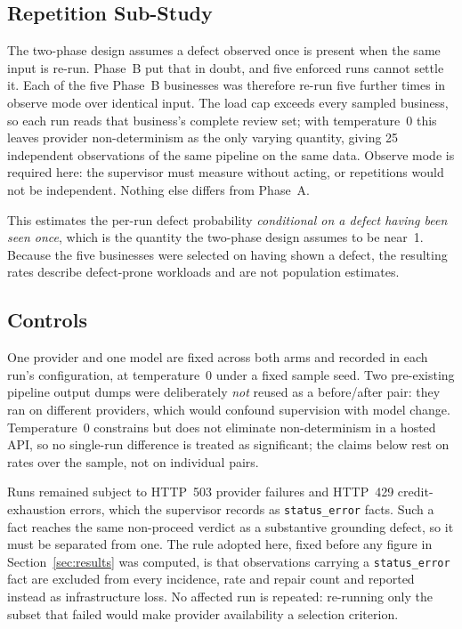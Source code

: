 \documentclass[runningheads]{llncs}
\begin{document}
\subsection{Repetition Sub-Study}
\label{sec:repetition}

The two-phase design assumes a defect observed once is present when the same
input is re-run. Phase~B put that in doubt, and five enforced runs cannot settle
it. Each of the five Phase~B businesses was therefore re-run five further times
in observe mode over identical input. The load cap exceeds every sampled
business, so each run reads that business's complete review set; with
temperature~0 this leaves provider non-determinism as the only varying quantity,
giving 25 independent observations of the same pipeline on the same data. Observe
mode is required here: the supervisor must measure without acting, or repetitions
would not be independent. Nothing else differs from Phase~A.

This estimates the per-run defect probability \emph{conditional on a defect
having been seen once}, which is the quantity the two-phase design assumes to be
near~1. Because the five businesses were selected on having shown a defect, the
resulting rates describe defect-prone workloads and are not population
estimates.

\subsection{Controls}

One provider and one model are fixed across both arms and recorded in each run's
configuration, at temperature~0 under a fixed sample seed. Two pre-existing
pipeline output dumps were deliberately \emph{not} reused as a before/after pair:
they ran on different providers, which would confound supervision with model
change. Temperature~0 constrains but does not eliminate non-determinism in a
hosted API, so no single-run difference is treated as significant; the claims
below rest on rates over the sample, not on individual pairs.

Runs remained subject to HTTP~503 provider failures and HTTP~429
credit-exhaustion errors, which the supervisor records as \texttt{status\_error}
facts. Such a fact reaches the same non-proceed verdict as a substantive grounding
defect, so it must be separated from one. The rule adopted here, fixed before any
figure in Section~\ref{sec:results} was computed, is that observations carrying a
\texttt{status\_error} fact are excluded from every incidence, rate and repair
count and reported instead as infrastructure loss. No affected run is repeated:
re-running only the subset that failed would make provider availability a
selection criterion.
\end{document}
